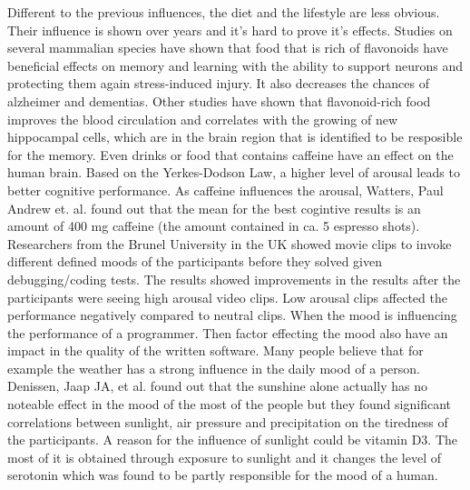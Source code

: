 Different to the previous influences, the diet and the lifestyle are less obvious. Their influence is shown over years and it's hard to prove it's effects.
Studies on several mammalian species have shown that food that is rich of flavonoids have beneficial effects on memory and learning with the ability to support neurons and protecting them again stress-induced injury.
It also decreases the chances of alzheimer and dementias. Other studies have shown that flavonoid-rich food improves the blood circulation and correlates with the growing of new hippocampal cells, which are in the brain region that is identified to be resposible for the memory.
Even drinks or food that contains caffeine have an effect on the human brain.
\bigbreak
Based on the Yerkes-Dodson Law, a higher level of arousal leads to better cognitive performance. As caffeine influences the arousal, Watters, Paul Andrew et. al. \cite{watters1997caffeine} found out that the mean for the best cogintive results is an amount of 400 mg caffeine (the amount contained in ca. 5 espresso shots).\\
Researchers from the Brunel University in the UK showed movie clips to invoke different defined moods of the participants before they solved given debugging/coding tests. The results showed improvements in the results after the participants were seeing high arousal video clips. Low arousal clips affected the performance negatively compared to neutral clips. \cite{khan2007mood}
When the mood is influencing the performance of a programmer. Then factor effecting the mood also have an impact in the quality of the written software. Many people believe that for example the weather has a strong influence in the daily mood of a person. Denissen, Jaap JA, et al. \cite{denissen2008effects} found out that the sunshine alone actually has no noteable effect in the mood of the most of the people but they found significant correlations between sunlight, air pressure and precipitation on the tiredness of the participants.
A reason for the influence of sunlight could be vitamin D3. The most of it is obtained through exposure to sunlight and it changes the level of serotonin which was found to be partly responsible for the mood of a human.
